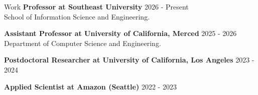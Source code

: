 \begin{rSection}{Work}
{\bf Professor at Southeast University} \hfill {2026 - Present}\\
School of Information Science and Engineering.

{\bf Assistant Professor at University of California, Merced} \hfill {2025 - 2026}\\
Department of Computer Science and Engineering.

{\bf Postdoctoral Researcher at University of California, Los Angeles} \hfill {2023 - 2024}

{\bf Applied Scientist at Amazon (Seattle)} \hfill {2022 - 2023}

\end{rSection}

